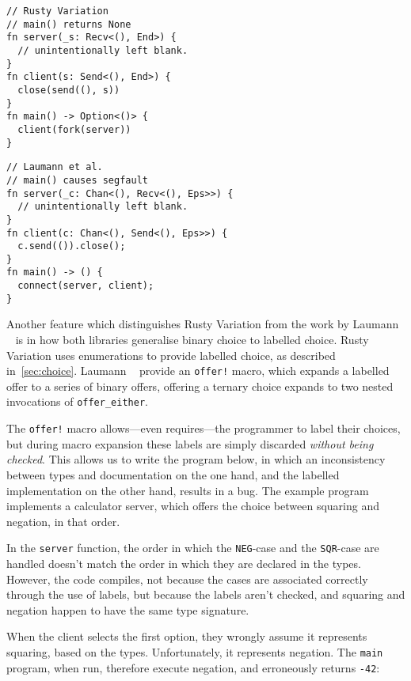 \documentclass[copyright,creativecommons]{eptcs}
\begin{document}
\vspace{-0.5\baselineskip}
\begin{minipage}[t]{0.5\linewidth}
\begin{lstlisting}
// Rusty Variation
// main() returns None
fn server(_s: Recv<(), End>) {
  // unintentionally left blank.
}
fn client(s: Send<(), End>) {
  close(send((), s))
}
fn main() -> Option<()> {
  client(fork(server))
}
\end{lstlisting}
\end{minipage}%
\begin{minipage}[t]{0.5\linewidth}
\begin{lstlisting}
// Laumann et al.
// main() causes segfault
fn server(_c: Chan<(), Recv<(), Eps>>) {
  // unintentionally left blank.
}
fn client(c: Chan<(), Send<(), Eps>>) {
  c.send(()).close();
}
fn main() -> () {
  connect(server, client);
}
\end{lstlisting}
\end{minipage}%

Another feature which distinguishes Rusty Variation from the work by Laumann \etal~\cite{jespersen2015} is in how both libraries generalise binary choice to labelled choice. Rusty Variation uses enumerations to provide labelled choice, as described in~\cref{sec:choice}. Laumann \etal~\cite{jespersen2015} provide an \lstinline{offer!} macro, which expands a labelled offer to a series of binary offers, \eg offering a ternary choice expands to two nested invocations of \lstinline{offer_either}.

The \lstinline{offer!} macro allows---even requires---the programmer to label their choices, but during macro expansion these labels are simply discarded \emph{without being checked}. This allows us to write the program below, in which an inconsistency between types and documentation on the one hand, and the labelled implementation on the other hand, results in a bug. The example program implements a calculator server, which offers the choice between squaring and negation, in that order.

In the \lstinline{server} function, the order in which the \lstinline{NEG}-case and the \lstinline{SQR}-case are handled doesn't match the order in which they are declared in the types. However, the code compiles, not because the cases are associated correctly through the use of labels, but because the labels aren't checked, and squaring and negation happen to have the same type signature.

When the client selects the first option, they wrongly assume it represents squaring, based on the types. Unfortunately, it represents negation. The \lstinline{main} program, when run, therefore execute negation, and erroneously returns \lstinline{-42}:
\end{document}
